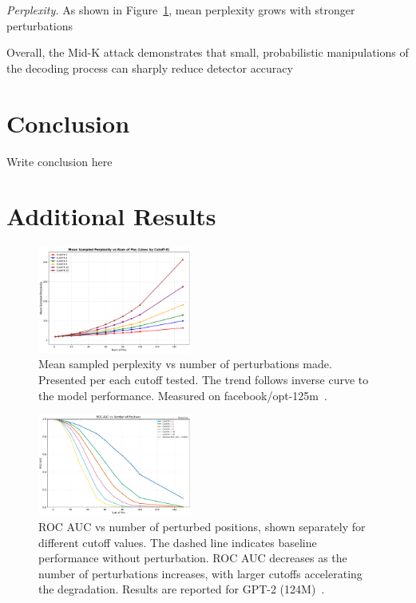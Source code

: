 \documentclass[11pt]{article}
\begin{document}
\textit{Perplexity.} As shown in Figure~\ref{fig:perplexity}, mean perplexity grows with stronger perturbations

Overall, the Mid-K attack demonstrates that small, probabilistic manipulations of the decoding process can sharply reduce detector accuracy

\section{Conclusion}

Write conclusion here




\newpage

\onecolumn

\appendix

\section{Additional Results}

\begin{figure}[H]
    \centering
    \includegraphics[width=0.45\textwidth]{graphs/attack/perplexity_main.pdf} %
    \caption{Mean sampled perplexity vs number of perturbations made. Presented per each cutoff tested. The trend follows inverse curve to the model performance. Measured on facebook/opt-125m~\cite{facebook125m}.}
    \label{fig:perplexity}
\end{figure}

\begin{figure}[H]
    \centering
    \includegraphics[width=0.45\textwidth]{graphs/attack/roc_vs_pos_by_k.pdf} %
    \caption{ROC AUC vs number of perturbed positions, shown separately for different cutoff values. The dashed line indicates baseline performance without perturbation. ROC AUC decreases as the number of perturbations increases, with larger cutoffs accelerating the degradation. Results are reported for GPT-2 (124M)~\cite{radford2019language}.}
    \label{fig:ROC_attack}
\end{figure}
\end{document}
